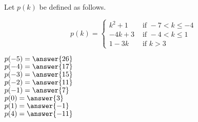 \documentclass{ximera}
\author{Lee Wayand}
\begin{document}
\begin{exercise}




Let $p(k)$ be defined as follows.

\[
p(k) = 
\begin{cases}
  k^2 + 1 & \text{ if } -7 < k \leq -4 \\
  -4k + 3 & \text{ if } -4 < k \leq 1 \\
  1 - 3k & \text{ if } k > 3
\end{cases}
\]



$p(-5) = \answer{26}$ \\


$p(-4) = \answer{17}$ \\


$p(-3) = \answer{15}$ \\


$p(-2) = \answer{11}$ \\


$p(-1) = \answer{7}$ \\


$p(0) = \answer{3}$ \\


$p(1) = \answer{-1}$ \\



$p(4) = \answer{-11}$ \\


\end{exercise}
\end{document}
